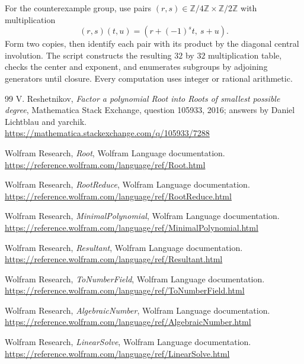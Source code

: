 \documentclass[11pt,letterpaper]{article}
\theoremstyle{definition}\newtheorem{definition}[theorem]{Definition}
\theoremstyle{remark}\newtheorem{remark}[theorem]{Remark}
\begin{document}
For the counterexample group, use pairs $(r,s)\in\mathbb Z/4\mathbb Z\times\mathbb Z/2\mathbb Z$ with multiplication
\[
 (r,s)(t,u)=(r+(-1)^s t,\ s+u).
\]
Form two copies, then identify each pair with its product by the diagonal central involution. The script constructs the resulting $32$ by $32$ multiplication table, checks the center and exponent, and enumerates subgroups by adjoining generators until closure. Every computation uses integer or rational arithmetic.

\clearpage
\begin{thebibliography}{99}
V. Reshetnikov, \emph{Factor a polynomial Root into Roots of smallest possible degree}, Mathematica Stack Exchange, question 105933, 2016; answers by Daniel Lichtblau and yarchik.\\
\url{https://mathematica.stackexchange.com/q/105933/7288}

Wolfram Research, \emph{Root}, Wolfram Language documentation.\\
\url{https://reference.wolfram.com/language/ref/Root.html}

Wolfram Research, \emph{RootReduce}, Wolfram Language documentation.\\
\url{https://reference.wolfram.com/language/ref/RootReduce.html}

Wolfram Research, \emph{MinimalPolynomial}, Wolfram Language documentation.\\
\url{https://reference.wolfram.com/language/ref/MinimalPolynomial.html}

Wolfram Research, \emph{Resultant}, Wolfram Language documentation.\\
\url{https://reference.wolfram.com/language/ref/Resultant.html}

Wolfram Research, \emph{ToNumberField}, Wolfram Language documentation.\\
\url{https://reference.wolfram.com/language/ref/ToNumberField.html}

Wolfram Research, \emph{AlgebraicNumber}, Wolfram Language documentation.\\
\url{https://reference.wolfram.com/language/ref/AlgebraicNumber.html}

Wolfram Research, \emph{LinearSolve}, Wolfram Language documentation.\\
\url{https://reference.wolfram.com/language/ref/LinearSolve.html}


\end{thebibliography}
\end{document}
